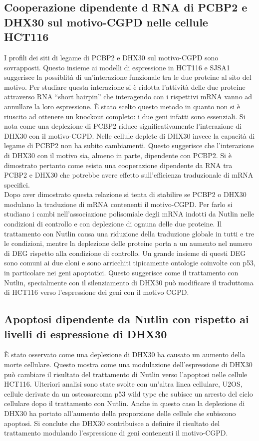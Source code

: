   \subsection{Cooperazione dipendente d RNA di PCBP2 e DHX30 sul motivo-CGPD nelle cellule HCT116}
  I profili dei siti di legame di PCBP2 e DHX30 sul motivo-CGPD sono sovrapposti.
  Questo insieme ai modelli di espressione in HCT116 e SJSA1 suggerisce la possiblit\`a di un'interazione funzionale tra le due proteine al sito del motivo.
  Per studiare questa interazione si \`e ridotta l'attivit\`a delle due proteine attraverso RNA ``short hairpin'' che interagendo con i rispettivi mRNA vanno ad annullare la loro espressione.
  \`E stato scelto questo metodo in quanto non si \`e riuscito ad ottenere un knockout completo: i due geni infatti sono essenziali.
  Si nota come una deplezione di PCBP2 riduce significativamente l'interazione di DHX30 con il motivo-CGPD.
  Nelle cellule deplete di DHX30 invece la capacit\`a di legame di PCBP2 non ha subito cambiamenti.
  Questo suggerisce che l'interazione di DHX30 con il motivo sia, almeno in parte, dipendente con PCBP2.
  Si \`e dimostrato pertanto come esista una cooperazione dipendente da RNA tra PCBP2 e DHX30 che potrebbe avere effetto sull'efficienza traduzionale di mRNA specifici.\\
  Dopo aver dimostrato questa relazione si tenta di stabilire se PCBP2 o DHX30 modulano la traduzione di mRNA contenenti il motivo-CGPD.
  Per farlo si studiano i cambi nell'associazione polisomiale degli mRNA indotti da Nutlin nelle condizioni di controllo e con deplezione di ognuna delle due proteine.
  Il trattamento con Nutlin causa una riduzione della traduzione globale in tutti e tre le condizioni, mentre la deplezione delle proteine porta a un aumento nel numero di DEG rispetto alla condizione di controllo.
  Un grande insieme di questi DEG sono comuni ai due cloni e sono arricchiti tipicamente ontologie coinvolte con p53, in particolare nei geni apoptotici.
  Questo suggerisce come il trattamento con Nutlin, specialmente con il silenziamento di DHX30 pu\`o modificare il traduttoma di HCT116 verso l'espressione dei geni con il motivo CGPD.

  \subsection{Apoptosi dipendente da Nutlin con rispetto ai livelli di espressione di DHX30}
  \`E stato osservato come una deplezione di DHX30 ha causato un aumento della morte cellulare.
  Questo mostra come una modulazione dell'espressione di DHX30 pu\`o cambiare il risultato del trattamento di Nutlin verso l'apoptosi nelle cellule HCT116.
  Ulteriori analisi sono state svolte con un'altra linea cellulare, U2OS, cellule derivate da un osteosarcoma p53 wild type che subisce un arresto del ciclo cellulare dopo il trattamento con Nutlin.
  Anche in questo caso la deplezione di DHX30 ha portato all'aumento della proporzione delle cellule che subiscono apoptosi.
  Si conclute che DHX30 contribuisce a definire il risultato del trattamento modulando l'espressione di geni contenenti il motivo-CGPD.





